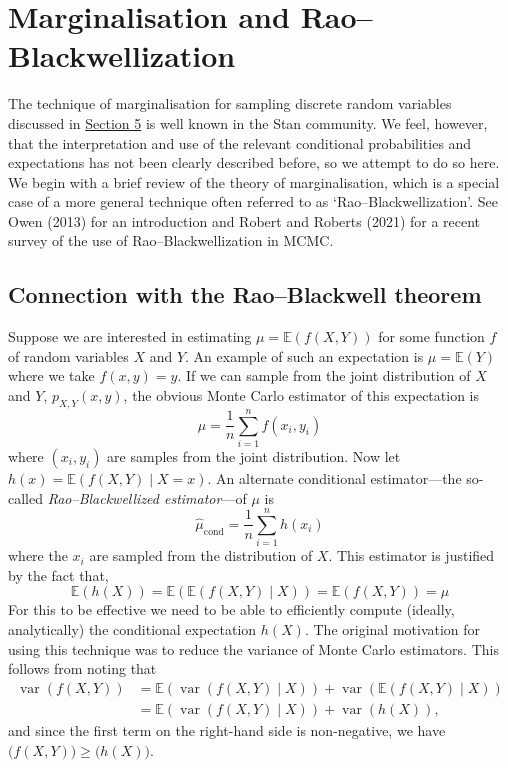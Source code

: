 \hypertarget{sec:rao-blackwellization}{%
\section{Marginalisation and Rao--Blackwellization}\label{sec:rao-blackwellization}}

The technique of marginalisation for sampling discrete random variables
discussed in \protect\hyperlink{sec:implementation}{Section 5} is well known in the Stan
community. We feel, however, that the interpretation and use of the
relevant conditional probabilities and expectations has not been clearly
described before, so we attempt to do so here. We begin with a brief
review of the theory of marginalisation, which is a special case of a
more general technique often referred to as `Rao--Blackwellization'. See
Owen (2013) for an introduction and Robert and Roberts (2021) for a
recent survey of the use of Rao--Blackwellization in MCMC.

\hypertarget{sec:rao-blackwell-connection}{%
\subsection{Connection with the Rao--Blackwell theorem}\label{sec:rao-blackwell-connection}}

Suppose we are interested in estimating \(\mu = \mathbb{E}(f(X, Y))\) for
some function \(f\) of random variables \(X\) and \(Y\). An example of such an
expectation is \(\mu = \mathbb{E}(Y)\) where we take \(f(x, y) = y\). If we
can sample from the joint distribution of \(X\) and \(Y\), \(p_{X, Y}(x, y)\),
the obvious Monte Carlo estimator of this expectation is
\[
\hat{\mu} = \frac{1}{n} \sum_{i = 1}^{n} f(x_i, y_i)
\]
where \((x_i, y_i)\) are samples from the joint distribution. Now let
\(h(x) = \mathbb{E}(f(X, Y) \mid X = x)\). An alternate conditional
estimator---the so-called \emph{Rao--Blackwellized estimator}---of \(\mu\) is
\[
\hat{\mu}_{\textrm{cond}} = \frac{1}{n} \sum_{i = 1}^{n}
h(x_i)
\]
where the \(x_i\) are sampled from the distribution of \(X\). This estimator
is justified by the fact that,
\[
\mathbb{E}(h(X)) = \mathbb{E}(\mathbb{E}(f(X, Y) \mid X)) = \mathbb{E}(f(X,Y)) = \mu
\]
For this to be effective we need to be able to efficiently compute
(ideally, analytically) the conditional expectation \(h(X)\). The original
motivation for using this technique was to reduce the variance of Monte
Carlo estimators. This follows from noting that
\[
\begin{aligned}
    \mathop{\mathrm{var}}(f(X, Y))
    &= \mathbb{E}(\mathop{\mathrm{var}}(f(X, Y) \mid X)) + \mathop{\mathrm{var}}(\mathbb{E}(f(X, Y) \mid X)) \\
    &= \mathbb{E}(\mathop{\mathrm{var}}(f(X, Y) \mid X)) + \mathop{\mathrm{var}}(h(X)),
\end{aligned}
\]
and since the first term on the right-hand side is non-negative, we have
\(\texttt{(}f(X, Y)) \geqslant \texttt{(}h(X))\).

